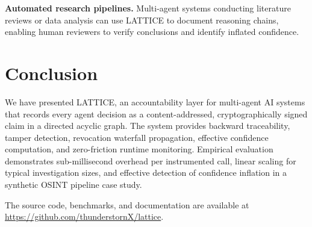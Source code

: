 \documentclass[11pt,twocolumn]{article}
\begin{document}
\textbf{Automated research pipelines.} Multi-agent systems conducting literature reviews or data analysis can use LATTICE to document reasoning chains, enabling human reviewers to verify conclusions and identify inflated confidence.

\section{Conclusion}

We have presented LATTICE, an accountability layer for multi-agent AI systems that records every agent decision as a content-addressed, cryptographically signed claim in a directed acyclic graph. The system provides backward traceability, tamper detection, revocation waterfall propagation, effective confidence computation, and zero-friction runtime monitoring. Empirical evaluation demonstrates sub-millisecond overhead per instrumented call, linear scaling for typical investigation sizes, and effective detection of confidence inflation in a synthetic OSINT pipeline case study.

The source code, benchmarks, and documentation are available at \url{https://github.com/thunderstornX/lattice}.
\end{document}
